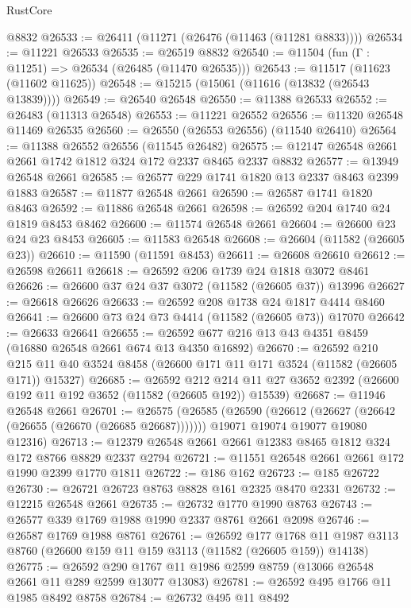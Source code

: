 \begin{lexlean}{RustCore}
\begin{coremodule}
    @8832
@26533 := @26411 (@11271 (@26476 (@11463 (@11281 @8833))))
@26534 := @11221 @26533
@26535 := @26519 @8832
@26540 := @11504 (fun (Γ : @11251) => @26534 (@26485 (@11470 @26535)))
@26543 := @11517 (@11623 (@11602 @11625))
@26548 := @15215 (@15061 (@11616 (@13832 (@26543 @13839))))
@26549 := @26540 @26548
@26550 := @11388 @26533
@26552 := @26483 (@11313 @26548)
@26553 := @11221 @26552
@26556 := @11320 @26548 @11469 @26535
@26560 := @26550 (@26553 @26556) (@11540 @26410)
@26564 := @11388 @26552 @26556 (@11545 @26482)
@26575 := @12147 @26548 @2661 @2661 @1742 @1812 @324 @172 @2337 @8465 @2337 @8832
@26577 := @13949 @26548 @2661
@26585 := @26577 @229 @1741 @1820 @13 @2337 @8463 @2399 @1883
@26587 := @11877 @26548 @2661
@26590 := @26587 @1741 @1820 @8463
@26592 := @11886 @26548 @2661
@26598 := @26592 @204 @1740 @24 @1819 @8453 @8462
@26600 := @11574 @26548 @2661
@26604 := @26600 @23 @24 @23 @8453
@26605 := @11583 @26548
@26608 := @26604 (@11582 (@26605 @23))
@26610 := @11590 (@11591 @8453)
@26611 := @26608 @26610
@26612 := @26598 @26611
@26618 := @26592 @206 @1739 @24 @1818 @3072 @8461
@26626 := @26600 @37 @24 @37 @3072 (@11582 (@26605 @37)) @13996
@26627 := @26618 @26626
@26633 := @26592 @208 @1738 @24 @1817 @4414 @8460
@26641 := @26600 @73 @24 @73 @4414 (@11582 (@26605 @73)) @17070
@26642 := @26633 @26641
@26655 := @26592 @677 @216 @13 @43 @4351 @8459 (@16880 @26548 @2661 @674 @13 @4350 @16892)
@26670 := @26592
    @210
    @215
    @11
    @40
    @3524
    @8458
    (@26600 @171 @11 @171 @3524 (@11582 (@26605 @171)) @15327)
@26685 := @26592
    @212
    @214
    @11
    @27
    @3652
    @2392
    (@26600 @192 @11 @192 @3652 (@11582 (@26605 @192)) @15539)
@26687 := @11946 @26548 @2661
@26701 := @26575
    (@26585
      (@26590 (@26612 (@26627 (@26642 (@26655 (@26670 (@26685 @26687)))))))
      @19071
      @19074
      @19077
      @19080
      @12316)
@26713 := @12379 @26548 @2661 @2661 @12383 @8465 @1812 @324 @172 @8766 @8829 @2337 @2794
@26721 := @11551 @26548 @2661 @2661 @172 @1990 @2399 @1770 @1811
@26722 := @186 @162
@26723 := @185 @26722
@26730 := @26721 @26723 @8763 @8828 @161 @2325 @8470 @2331
@26732 := @12215 @26548 @2661
@26735 := @26732 @1770 @1990 @8763
@26743 := @26577 @339 @1769 @1988 @1990 @2337 @8761 @2661 @2098
@26746 := @26587 @1769 @1988 @8761
@26761 := @26592
    @177
    @1768
    @11
    @1987
    @3113
    @8760
    (@26600 @159 @11 @159 @3113 (@11582 (@26605 @159)) @14138)
@26775 := @26592 @290 @1767 @11 @1986 @2599 @8759 (@13066 @26548 @2661 @11 @289 @2599 @13077 @13083)
@26781 := @26592 @495 @1766 @11 @1985 @8492 @8758
@26784 := @26732 @495 @11 @8492

\end{coremodule}
\end{lexlean}
